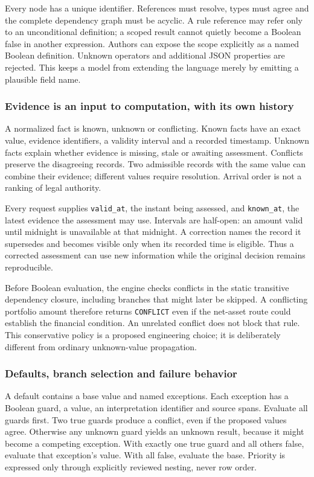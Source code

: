 Every node has a unique identifier. References must resolve, types must agree
and the complete dependency graph must be acyclic. A rule reference may refer
only to an unconditional definition; a scoped result cannot quietly become a
Boolean false in another expression. Authors can expose the scope explicitly
as a named Boolean definition. Unknown operators and additional JSON properties
are rejected. This keeps a model from extending the language merely by emitting
a plausible field name.

\subsubsection{Evidence is an input to computation, with its own history}

A normalized fact is known, unknown or conflicting. Known facts have an exact
value, evidence identifiers, a validity interval and a recorded timestamp.
Unknown facts explain whether evidence is missing, stale or awaiting assessment.
Conflicts preserve the disagreeing records. Two admissible records with the
same value can combine their evidence; different values require resolution.
Arrival order is not a ranking of legal authority.

Every request supplies \texttt{valid\_at}, the instant being assessed, and
\texttt{known\_at}, the latest evidence the assessment may use. Intervals are
half-open: an amount valid until midnight is unavailable at that midnight.
A correction names the record it supersedes and becomes visible only when its
recorded time is eligible. Thus a corrected assessment can use new information
while the original decision remains reproducible.

Before Boolean evaluation, the engine checks conflicts in the static transitive
dependency closure, including branches that might later be skipped. A conflicting
portfolio amount therefore returns \texttt{CONFLICT} even if the net-asset route
could establish the financial condition. An unrelated conflict does not block
that rule. This conservative policy is a proposed engineering choice; it is
deliberately different from ordinary unknown-value propagation.

\subsubsection{Defaults, branch selection and failure behavior}

A default contains a base value and named exceptions. Each exception has a
Boolean guard, a value, an interpretation identifier and source spans. Evaluate
all guards first. Two true guards produce a conflict, even if the proposed values
agree. Otherwise any unknown guard yields an unknown result, because it might
become a competing exception. With exactly one true guard and all others false,
evaluate that exception's value. With all false, evaluate the base. Priority is
expressed only through explicitly reviewed nesting, never row order.

